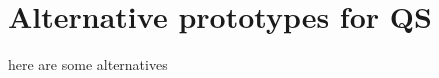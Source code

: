 \appendix

\section{Alternative prototypes for QS}
\label{sec:appendix_interface_alternative}

here are some alternatives
